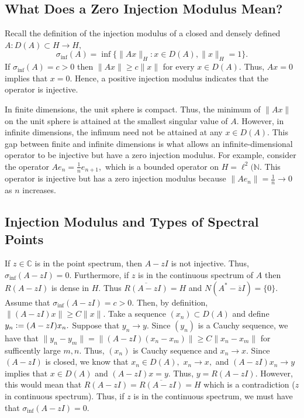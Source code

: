 \documentclass[12pt,a4paper]{article}
\newcommand{\defeq}{\vcentcolon=}
\theoremstyle{boldthm}
\theoremstyle{bolddefn}
\begin{document}
\subsection{What Does a Zero Injection Modulus Mean?}

Recall the definition of the injection modulus of a closed and densely defined $A: D(A) \subset H \rightarrow H,$ 
\begin{equation} \label{inject}
    \sigma_{\inf}(A) = \inf\{ \|Ax\|_H : x \in D(A), \|x\|_H = 1\}.
\end{equation}
If $\sigma_{\inf}(A) = c > 0$ then $\|Ax\| \ge c \|x\|$ for every $x \in D(A).$ Thus, $Ax = 0$ implies that $x=0.$ Hence, a positive injection modulus indicates that the operator is injective.

In finite dimensions, the unit sphere is compact. Thus, the minimum of $\|Ax\|$ on the unit sphere is attained at the smallest singular value of $A.$ However, in infinite dimensions, the infimum need not be attained at any $x \in D(A).$ This gap between finite and infinite dimensions is what allows an infinite-dimensional operator to be injective but have a zero injection modulus. For example, consider the operator $Ae_n = \frac{1}{n} e_{n+1},$ which is a bounded operator on $H = \ell^2(\mathbb{N}.$ This operator is injective but has a zero injection modulus because $\|Ae_n\| = \frac{1}{n} \rightarrow 0$ as $n$ increases.


\subsection{Injection Modulus and Types of Spectral Points}


If $z \in \mathbb{C}$ is in the point spectrum, then $A-zI$ is not injective. Thus, $\sigma_{\inf}(A-zI) = 0.$
Furthermore, if $z$ is in the continuous spectrum of $A$ then $R(A-zI)$ is dense in $H.$ Thus $\overline{R(A-zI)} = H$ and $N(A^*-\overline z I) = \{0\}.$ Assume that $\sigma_{\inf}(A-zI) = c > 0.$ Then, by definition, $\|(A-zI) x \| \ge C \|x\|.$ Take a sequence $(x_n) \subset D(A)$ and define $y_n \defeq (A-zI) x_n.$ Suppose that $y_n \rightarrow y.$ Since $(y_n)$ is a Cauchy sequence, we have that $\| y_n - y_m \| = \| (A-zI) (x_n - x_m) \| \ge  C \| x_n - x_m \|$ for sufficently large $m, n.$ Thus, $(x_n)$ is  Cauchy sequence and $x_n \rightarrow x.$ Since $(A-zI)$ is closed, we know that $x_n \in D(A),$ $x_n \rightarrow x,$ and $(A-zI) x_n \rightarrow y$ implies that $x \in D(A)$ and $(A-zI)x = y.$ Thus, $y = R(A-zI).$ However, this would mean that $R(A-zI) = \overline{R(A-zI)} = H$ which is a contradiction ($z$ in continuous spectrum). Thus, if $z$ is in the continuous spectrum, we must have that $\sigma_{\inf}(A-zI) = 0.$ 
\end{document}
